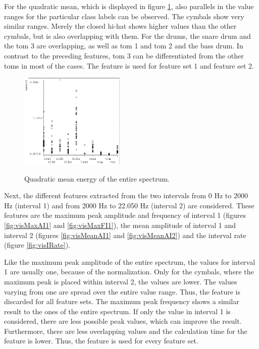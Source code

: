 For the quadratic mean, which is displayed in figure \ref{fig:visMeanA}, also parallels in the value ranges for the particular class labels can be observed. The cymbals show very similar ranges. Merely the closed hi-hat shows higher values than the other cymbals, but is also overlapping with them. For the drums, the snare drum and the tom 3 are overlapping, as well as tom 1 and tom 2 and the bass drum. In contrast to the preceding features, tom 3 can be differentiated  from the other toms in most of the cases. The feature is used for feature set 1 and feature set 2.

\begin{figure}[tp]
	\centering
	\includegraphics[width=5cm]{images/weka/vis/meanA.png}
	\label{fig:visMeanA}
	\caption{Quadratic mean energy of the entire spectrum.}
	\label{fig:visMeanA}
\end{figure}

Next, the different features extracted from the two intervals from 0 Hz to 2000 Hz (interval 1) and from 2000 Hz to 22.050 Hz (interval 2) are considered. These features are the maximum peak amplitude and frequency of interval 1 (figures \ref{fig:visMaxAI1} and \ref{fig:visMaxFI1}), the mean amplitude of interval 1 and interval 2 (figures \ref{fig:visMeanAI1} and \ref{fig:visMeanAI2}) and the interval rate (figure \ref{fig:visIRate}).

Like the maximum peak amplitude of the entire spectrum, the values for interval 1 are usually one, because of the normalization. Only for the cymbals, where the maximum peak is placed within interval 2, the values are lower. The values varying from one are spread over the entire value range. Thus, the feature is discarded for all feature sets. The maximum peak frequency shows a similar result to the ones of the entire spectrum. If only the value in interval 1 is considered, there are less possible peak values, which can improve the result. Furthermore, there are less overlapping values and the calculation time for the feature is lower. Thus, the feature is used for every feature set.

